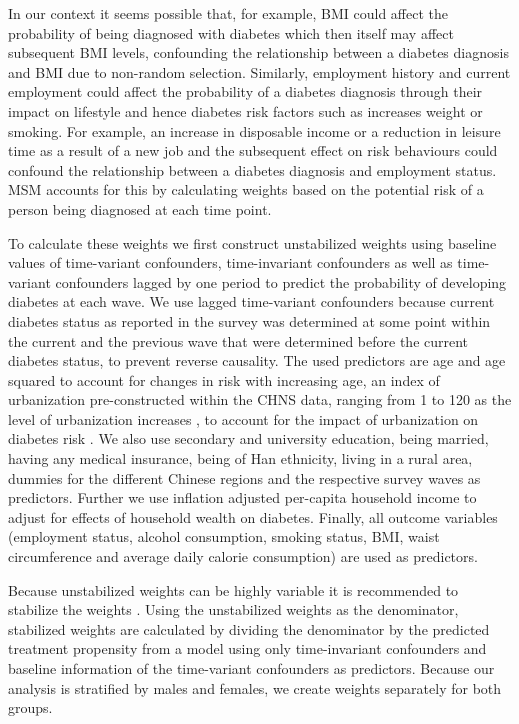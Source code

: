 In our context it seems possible that, for example, \ac{BMI} could affect the probability of being diagnosed with diabetes which then itself may affect subsequent \ac{BMI} levels, confounding the relationship between a diabetes diagnosis and \ac{BMI} due to non-random selection. Similarly, employment history and current employment could affect the probability of a diabetes diagnosis through their impact on lifestyle and hence diabetes risk factors such as increases weight or smoking. For example, an increase in disposable income or a reduction in leisure time as a result of a new job and the subsequent effect on risk behaviours could confound the relationship between a diabetes diagnosis and employment status. \ac{MSM} accounts for this by calculating weights based on the potential risk of a person being diagnosed at each time point. 

To calculate these weights we first construct unstabilized weights using baseline values of time-variant confounders, time-invariant confounders as well as time-variant confounders lagged by one period to predict the probability of developing diabetes at each wave. We use lagged time-variant confounders because current diabetes status as reported in the survey was determined at some point within the current and the previous wave that were determined before the current diabetes status, to prevent reverse causality. The used predictors are age and age squared to account for changes in risk with increasing age, an index of urbanization pre-constructed within the \ac{CHNS} data, ranging from 1 to 120 as the level of urbanization increases \parencite{Zhang2014d}, to account for the impact of urbanization on diabetes risk \parencite{Attard2012}. We also use secondary and university education, being married, having any medical insurance, being of Han ethnicity, living in a rural area, dummies for the different Chinese regions and the respective survey waves as predictors. Further we use inflation adjusted per-capita household income to adjust for effects of household wealth on diabetes. Finally, all outcome variables (employment status, alcohol consumption, smoking status, \ac{BMI}, waist circumference and average daily calorie consumption) are used as predictors. 

Because unstabilized weights can be highly variable it is recommended to stabilize the weights \parencite{Cole2008}. Using the unstabilized weights as the denominator, stabilized weights are calculated by dividing the denominator by the predicted treatment propensity from a model using only time-invariant confounders and baseline information of the time-variant confounders as predictors.  Because our analysis is stratified by males and females, we create weights separately for both groups.

